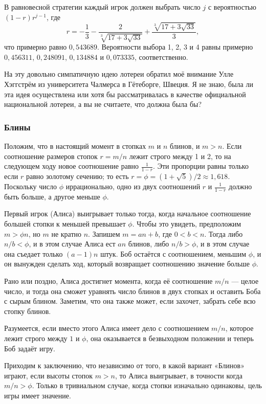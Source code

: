 В равновесной стратегии каждый игрок должен выбрать число $j$ с вероятностью $(1-r)r^{j-1}$, где 
\[r = -\frac13-\frac2{\sqrt[3]{17+3\sqrt{33}}}+\frac{\sqrt[3]{17+3\sqrt{33}}}3,\]
что примерно равно $0{,}543689$.
Вероятности выбора 1, 2, 3 и 4 равны примерно $0{,}456311$, $0{,}248091$, $0{,}134884$ и $0{,}073335$, соответственно.

На эту довольно симпатичную идею лотереи обратил моё внимание Улле Хэггстрём из университета Чалмерса в Гётеборге, Швеция. %
Я не знаю, была ли эта идея осуществлена или хотя бы рассматривалась в качестве официальной национальной лотереи, а вы не считаете, что должна была бы?

\subsubsection*{Блины}%

Положим, что в настоящий момент в стопках $m$ и $n$ блинов, и $m > n$.
Если соотношение размеров стопок $r = m/n$ лежит строго между 1 и 2, то на следующем ходу новое соотношение равно $\tfrac1{1-r}$.
Эти пропорции равны только если $r$ равно золотому сечению;
то есть $r=\phi=(1+\sqrt{5})/2\approx 1{,}618$.
Поскольку число $\phi$ иррационально, одно из двух соотношений $r$ и $\tfrac1{1-r}$ должно быть больше, а другое меньше $\phi$.

Первый игрок (Алиса) выигрывает только тогда, когда начальное соотношение большей стопки к меньшей превышает $\phi$.
Чтобы это увидеть, предположим $m>\phi n$, но $m$ не кратно $n$.
Запишем $m=an+b$, где $0<b<n$.
Тогда либо $n/b<\phi$, и в этом случае Алиса ест $an$ блинов, либо $n/b>\phi$, и в этом случае она съедает только $(a-1)n$ штук.
Боб остаётся с соотношением, меньшим $\phi$, и он вынужден сделать ход, который возвращает соотношению значение больше $\phi$.

Рано или поздно, Алиса достигнет момента, когда её соотношение $m/n$ --- целое число, и тогда она сможет уравнять число блинов в двух стопках и оставить Боба с сырым блином.
Заметим, что она также может, если захочет, забрать себе всю стопку блинов.

Разумеется, если вместо этого Алиса имеет дело с соотношением $m/n$, которое лежит строго между $1$ и $\phi$, она оказывается в безвыходном положении %
и теперь Боб задаёт игру.

Приходим к заключению, что независимо от того, в какой вариант «Блинов» играют, если высоты стопок $m>n$, то Алиса выигрывает, в точности когда $m/n>\phi$.
Только в тривиальном случае, когда стопки изначально одинаковы, цель игры имеет значение.\heart

